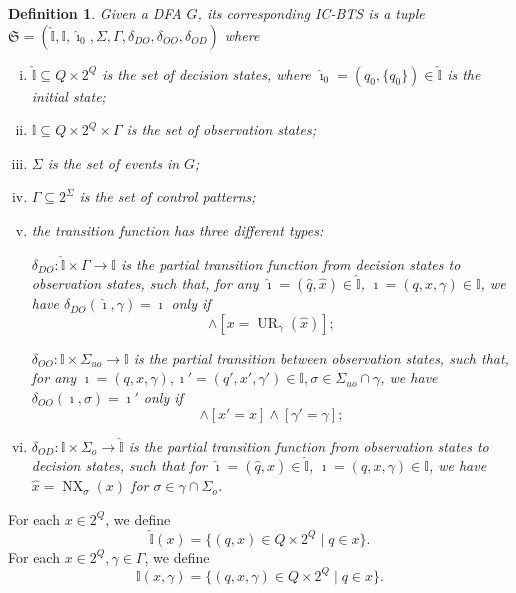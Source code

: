 \documentclass[twocolumn]{autart}
\def \UR{\operatorname{UR}}
\def \NX{\operatorname{NX}}
\newtheorem{mydef}{\bf Definition}
\begin{document}
\begin{mydef}\label{def:bcc}
Given a DFA $G$, its corresponding IC-BTS is a tuple
$
\mathfrak{S} = (\hat{\mathbb{I}}, \mathbb{I}, \hat{\imath}_0, \Sigma, \Gamma, \delta_{DO}, \delta_{OO}, \delta_{OD})
$
where
\begin{enumerate}[(i)]
    \item 
    $\hat{\mathbb{I}} \subseteq Q \times 2^Q$ is the set of  \emph{decision states}, 
    where $\hat{\imath}_0 = ( q_0,\{ q_0 \}) \in \hat{\mathbb{I}}$ is the initial state; 
    \item 
    $\mathbb{I}  \subseteq Q \times 2^Q\times \Gamma$ is the set of  \emph{observation states};
    \item 
    $\Sigma$ is the set of events in $G$;
    \item
    $\Gamma \subseteq 2^{\Sigma}$ is the set of control patterns; 
    \item 
    the transition function has three different types: 
    
    $\delta_{DO} : \hat{\mathbb{I}} \times \Gamma \rightarrow \mathbb{I}$ is the partial transition function from decision states to observation states, such that, for any
    $\hat{\imath} = (\hat{q}, \hat{x}) \in \hat{\mathbb{I}}$, 
    $\imath = ({q}, {x},\gamma) \in {\mathbb{I}}$,
    we have $\delta_{DO}(\hat{\imath},\gamma)=\imath$ only if 
    \begin{equation}
        [q=\hat{q}] \wedge [{x} = \UR_{\gamma}(\hat{x})];
    \end{equation}
    
    $\delta_{OO} : \mathbb{I} \times \Sigma_{uo} \rightarrow \mathbb{I}$ is the partial transition between observation states, such that, for any
    $\imath = ({q}, {x},\gamma),\imath' = ({q}', {x}',\gamma')  \in {\mathbb{I}},\sigma\in\Sigma_{uo}\cap\gamma$,
    we have $\delta_{OO}({\imath},\sigma)=\imath'$ only if 
    \begin{equation}
        [q'=\delta(q,\sigma)] \wedge [x'=x]  \wedge [\gamma'=\gamma];
    \end{equation}

    \item $\delta_{OD} : \mathbb{I} \times \Sigma_o \rightarrow \hat{\mathbb{I}}$ is the partial transition function from observation states to decision states, such that for $\hat{\imath} = (\hat{q}, \hat{x}) \in \hat{\mathbb{I}}$, $\imath = ({q}, {x},\gamma) \in {\mathbb{I}}$, we have $\hat{x} = \NX_{\sigma}({x})$ for $\sigma \in \gamma \cap \Sigma_o$.

    
\end{enumerate}
\end{mydef}
For each $x\in 2^Q$, we define 
\[
\hat{\mathbb{I}}(x)=\{ (q,x)\in Q\times 2^Q\mid q\in x \}.
\]
For each $x\in 2^Q,\gamma\in \Gamma$, we define 
\[
{\mathbb{I}}(x,\gamma)=\{ (q,x,\gamma)\in Q\times 2^Q\mid q\in x \}.
\]
\end{document}
